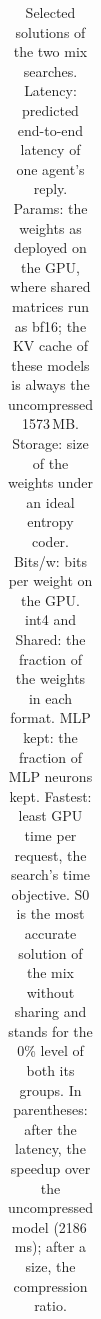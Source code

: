 \documentclass[11pt]{article}
\begin{document}
\begin{table}[!ht]
\begin{tabular}{lcccccccc}
\bottomrule
\end{tabular}
\caption{Selected solutions of the two mix searches. Latency: predicted end-to-end latency of one agent's reply. Params: the weights as deployed on the GPU, where shared matrices run as bf16; the KV cache of these models is always the uncompressed 1573\,MB. Storage: size of the weights under an ideal entropy coder. Bits/w: bits per weight on the GPU. int4 and Shared: the fraction of the weights in each format. MLP kept: the fraction of MLP neurons kept. Fastest: least GPU time per request, the search's time objective. S0 is the most accurate solution of the mix without sharing and stands for the 0\% level of both its groups. In parentheses: after the latency, the speedup over the uncompressed model (2186\,ms); after a size, the compression ratio.}
\label{tab:turnmodels}
\end{table}
\end{document}
